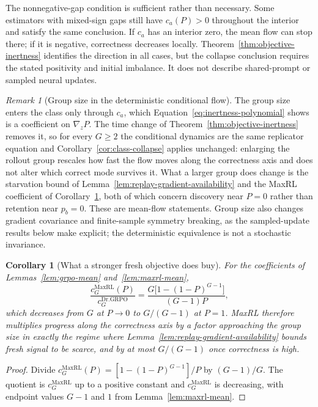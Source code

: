 \documentclass{article}
\newcommand{\1}{\mathbf 1}
\newtheorem{corollary}[lemma]{Corollary}
\theoremstyle{remark}
\newtheorem{remark}[lemma]{Remark}
\theoremstyle{definition}
\theoremstyle{plain}
\begin{document}
The nonnegative-gap condition is sufficient rather than necessary. Some
estimators with mixed-sign gaps still have $c_a(P)>0$ throughout the interior
and satisfy the same conclusion. If $c_a$ has an interior zero, the mean flow
can stop there; if it is negative, correctness decreases locally.
Theorem~\ref{thm:objective-inertness} identifies the direction in all cases,
but the collapse conclusion requires the stated positivity and initial
imbalance. It does not describe shared-prompt or sampled neural updates.

\begin{remark}[Group size in the deterministic conditional flow]
\label{rem:group-size-inert}
The group size enters the class only through $c_a$, which
Equation~\eqref{eq:inertness-polynomial} shows is a coefficient on
$\nabla_zP$. The time change of Theorem~\ref{thm:objective-inertness} removes
it, so for every $G\ge2$ the conditional dynamics are the same replicator
equation and Corollary~\ref{cor:class-collapse} applies unchanged: enlarging
the rollout group rescales how fast the flow moves along the correctness axis
and does not alter which correct mode survives it. What a larger group does
change is the starvation bound of
Lemma~\ref{lem:replay-gradient-availability} and the MaxRL coefficient of
Corollary~\ref{cor:maxrl-starvation}, both of which concern discovery near
$P=0$ rather than retention near $p_b=0$. These are mean-flow statements. Group size also changes gradient covariance
and finite-sample symmetry breaking, as the sampled-update results below
make explicit; the deterministic equivalence is not a stochastic invariance.
\end{remark}

\begin{corollary}[What a stronger fresh objective does buy]
\label{cor:maxrl-starvation}
For the coefficients of Lemmas~\ref{lem:grpo-mean} and~\ref{lem:maxrl-mean},
\[
 \frac{c_G^{\mathrm{MaxRL}}(P)}{c_G^{\mathrm{Dr.GRPO}}}
 =\frac{G\big[1-(1-P)^{G-1}\big]}{(G-1)P},
\]
which decreases from $G$ at $P\to0$ to $G/(G-1)$ at $P=1$. MaxRL therefore
multiplies progress along the correctness axis by a factor approaching the
group size in exactly the regime where
Lemma~\ref{lem:replay-gradient-availability} bounds fresh signal to be scarce,
and by at most $G/(G-1)$ once correctness is high.
\end{corollary}

\begin{proof}
Divide $c_G^{\mathrm{MaxRL}}(P)=[1-(1-P)^{G-1}]/P$ by $(G-1)/G$. The quotient
is $c_G^{\mathrm{MaxRL}}$ up to a positive constant and
$c_G^{\mathrm{MaxRL}}$ is decreasing, with endpoint values $G-1$ and $1$ from
Lemma~\ref{lem:maxrl-mean}.
\end{proof}
\end{document}
